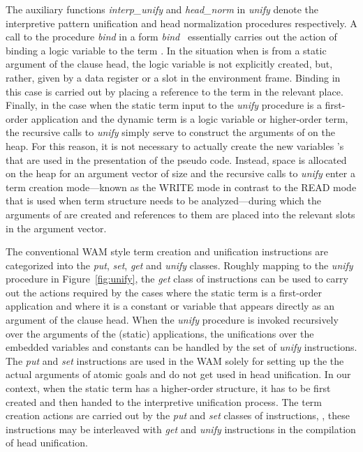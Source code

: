 The auxiliary functions {\it interp\_unify}
and {\it head\_norm} in {\it unify} denote the interpretive
pattern unification and head normalization procedures respectively.
A call to the procedure {\it bind} in a form {\it bind\ }
essentially carries out the action of binding a logic variable  to the
term .
In the situation when  is from a static argument of the clause head,
the logic variable is not explicitly created, but, rather, given by a
data register or a slot in the environment frame.
Binding in this case is carried out by placing a reference to the term
 in the relevant place.
Finally, in the case when the static term  input to the {\it unify}
procedure is a first-order application and the dynamic term  is a logic
variable or higher-order term, the recursive calls to {\it unify} simply
serve to construct the arguments of  on the heap. For this reason, it is
not necessary to actually create the new variables 's that are used
in the presentation of the pseudo code. Instead, space is allocated on
the heap for an argument vector of size  and the recursive calls to
{\it unify} enter a term creation mode---known as the WRITE mode in
contrast to the READ mode that is used when term structure needs to be
analyzed---during which the arguments of  are
created and references to them are placed into the relevant slots in the
argument vector.

The conventional WAM style term creation and unification instructions
are categorized into the {\it put}, {\it set}, {\it get}
and {\it unify} classes. Roughly mapping to the {\it unify} procedure in
Figure~\ref{fig:unify}, the {\it get} class of instructions can be used to
carry out the actions required by the cases where the static term is a
first-order application and where it is a constant or variable that appears
directly as an argument of the clause head.
When the {\it unify} procedure is invoked recursively over the
arguments of the (static) applications, the unifications over the embedded
variables and constants can be handled by the set of {\it unify} instructions.
The {\it put} and {\it set} instructions are used in the WAM solely for
setting up the the actual arguments of atomic goals and do not get used
in head unification. In our context, when the static
term has a higher-order structure, it has to be first
created and then handed to the interpretive unification process.
The term creation actions are carried out by
the {\it put} and {\it set} classes of instructions, \ie, these
instructions may be interleaved with {\it get} and {\it unify}
instructions in the compilation of head unification.


